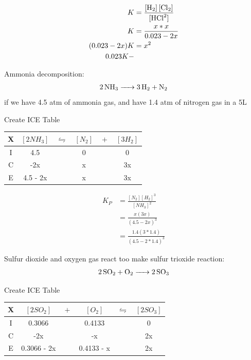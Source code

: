 \documentclass{article}  %
\begin{document}
\begin{equation*}
    \begin{aligned}
        K &= \ce{\frac{[H_2] [Cl_2]}{[HCl^2]}} \\
        K &= \frac{x*x}{0.023 - 2x} \\
        (0.023 - 2x)K &= x^2 \\
        0.023K - 
    \end{aligned}
\end{equation*}



Ammonia decomposition:
\begin{equation*}
    \begin{aligned}
        \ce{2NH3 -> 3H2 + N2}
    \end{aligned}
\end{equation*}
if we have 4.5 atm of ammonia gas, and have 1.4 atm of nitrogen gas in a 5L 

Create ICE Table \\
\begin{tabular}{c|c@{}c@{}c@{}c@{}c}
    \hline
    X   &   $[2NH_3]$ & ${}\leftrightharpoons{}$ & $[N_2]$ & ${}+{}$ & $[3H_2]$\\
    \hline
    I   &       4.5     &&   0                            &&  0       \\
    C   &       -2x      &&   x                           &&  3x      \\
    E   &   4.5 - 2x     &&   x                           &&  3x      \\
    \hline
\end{tabular}
\begin{equation*}
    \begin{aligned}
        K_P &= \frac{[N_2] [H_2]^3}{[NH_3]^2} \\
            &= \frac{x(3x)}{(4.5-2x)^3} \\
            &= \frac{1.4(3*1.4)}{(4.5-2*1.4)^3} 
    \end{aligned}
\end{equation*}

Sulfur dioxide and oxygen gas react too make sulfur trioxide reaction:
\begin{equation*}
    \begin{aligned}
        \ce{2SO2 + O2 -> 2SO3}
    \end{aligned}
\end{equation*}

Create ICE Table \\
\begin{tabular}{c|c@{}c@{}c@{}c@{}c}
    \hline
    X   &   $[2SO_2]$ & ${}+{}$ & $[O_2]$ & ${}\leftrightharpoons{}$ & $[2SO_3]$ \\
    \hline
    I   &       0.3066       &&   0.4133        &&  0       \\
    C   &       -2x      &&   -x        &&  2x      \\
    E   &       0.3066 - 2x     &&   0.4133 - x        &&  2x      \\
    \hline
\end{tabular}
\end{document}
